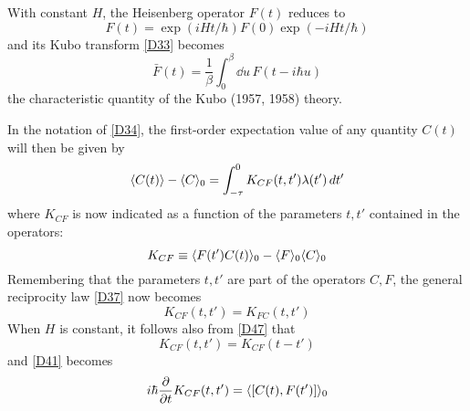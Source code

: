 With constant $H$, the Heisenberg operator $F(t)$ reduces to
\begin{equation}
	\label{D47}
	F(t) = \exp (i H t / \hbar) F(0) \exp(- i H t/\hbar)
\end{equation}
and its Kubo transform \eqref{D33} becomes
\begin{equation}
	\bar{F}(t) = \frac{1}{\beta} \int_{0}^{\beta}\! \dd u\, F(t - i\hbar u)
\end{equation}
the characteristic quantity of the Kubo (\cite{kubo57}{1957}, \cite{kubo58}{1958}) theory.

In the notation of \eqref{D34}, the first-order expectation value of any quantity $C(t)$ will then be given by
\begin{equation}
	\label{D49}
	\langle C(t)\rangle - \langle C\rangle_0 = \int_{-\tau}^{0} K_{CF} (t, t') \lambda(t') \mathop{}\!d t'
\end{equation}
where $K_{CF}$ is now indicated as a function of the parameters $t, t'$ contained in the operators:
\begin{equation}
	K_{CF} \equiv \langle F(t') C(t)\rangle_0 - \langle F\rangle_0 \langle C\rangle_0
\end{equation}
Remembering that the parameters $t, t'$ are part of the operators $C, F$, the general reciprocity law \eqref{D37} now becomes
\begin{equation}
	K_{CF}(t, t') = K_{FC}(t, t')
\end{equation}
When $H$ is constant, it follows also from \eqref{D47} that
\begin{equation}
	K_{CF}(t, t') = K_{CF}(t - t')
\end{equation}
and \eqref{D41} becomes
\begin{equation}
	\label{D53}
	i\hbar \pdv*{K_{CF}(t, t')}{t} = \langle[C(t), F(t')]\rangle_0
\end{equation}

